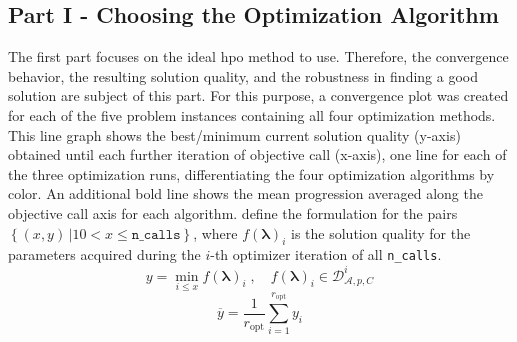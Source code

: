 \subsection{Part I - Choosing the Optimization Algorithm}
\label{chap:an-part1}
The first part focuses on the ideal \gls{hpo} method to use. Therefore, the convergence behavior, the resulting solution quality, and the robustness in finding a good solution are subject of this part. For this purpose, a convergence plot was created for each of the five problem instances containing all four optimization methods. This line graph shows the best/minimum current solution quality (y-axis) obtained until each further iteration of objective call (x-axis), one line for each of the three optimization runs, differentiating the four optimization algorithms by color. An additional bold line shows the mean progression averaged along the objective call axis for each algorithm.  define the formulation for the pairs $\left\lbrace (x,y) \, | 10 < x \leq \texttt{n\_calls} \right\rbrace $, where $f(\mathbf{\lambda})_i$ is the solution quality for the parameters acquired during the $i$-th optimizer iteration of all \texttt{n\_calls}.
\begin{equation}
	\label{eq:convergence-plot}
	y = \min_{i \leq x} f(\mathbf{\lambda})_i \; , \quad f(\mathbf{\lambda})_i \in \mathcal{D}^i_{\mathcal{A},p,C}
\end{equation}
\begin{equation}
	\label{eq:convergence-plot-mean}
	\overline{y} = \frac{1}{r_\text{opt}} \sum_{i=1}^{r_\text{opt}} y_i
\end{equation}

